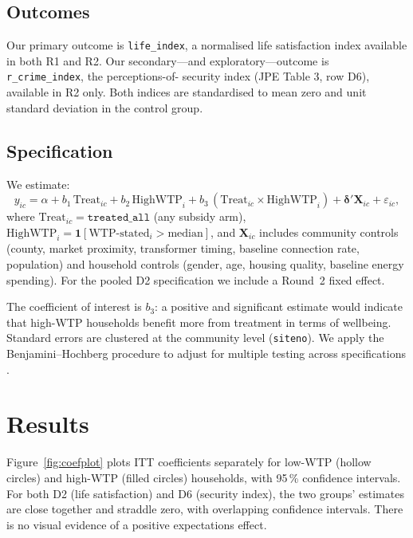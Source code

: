 \documentclass[12pt]{article}
\begin{document}
\subsection*{Outcomes}

Our primary outcome is \texttt{life\_index}, a normalised life
satisfaction index available in both R1 and R2. Our secondary---and
exploratory---outcome is \texttt{r\_crime\_index}, the perceptions-of-%
security index (JPE Table 3, row D6), available in R2 only. Both
indices are standardised to mean zero and unit standard deviation in the
control group.

\subsection*{Specification}

We estimate:
\begin{equation}
\label{eq:spec}
y_{ic} = \alpha
  + b_1\,\text{Treat}_{ic}
  + b_2\,\text{HighWTP}_{i}
  + b_3\,(\text{Treat}_{ic} \times \text{HighWTP}_{i})
  + \boldsymbol{\delta}'\mathbf{X}_{ic}
  + \varepsilon_{ic},
\end{equation}
where $\text{Treat}_{ic} = \texttt{treated\_all}$ (any subsidy arm),
$\text{HighWTP}_i = \mathbf{1}[\text{WTP-stated}_i > \text{median}]$,
and $\mathbf{X}_{ic}$ includes community controls (county, market
proximity, transformer timing, baseline connection rate, population) and
household controls (gender, age, housing quality, baseline energy spending).
For the pooled D2 specification we include a Round~2 fixed effect.

\noindent
The coefficient of interest is $b_3$: a positive and significant
estimate would indicate that high-WTP households benefit more from
treatment in terms of wellbeing. Standard errors are clustered at the
community level (\texttt{siteno}). We apply the Benjamini--Hochberg
procedure to adjust for multiple testing across specifications
\citep{benjamini1995}.

\section{Results}
\label{sec:results}

Figure~\ref{fig:coefplot} plots ITT coefficients separately for
low-WTP (hollow circles) and high-WTP (filled circles) households,
with 95\,\% confidence intervals. For both D2 (life satisfaction) and
D6 (security index), the two groups' estimates are close together and
straddle zero, with overlapping confidence intervals. There is no visual
evidence of a positive expectations effect.
\end{document}
